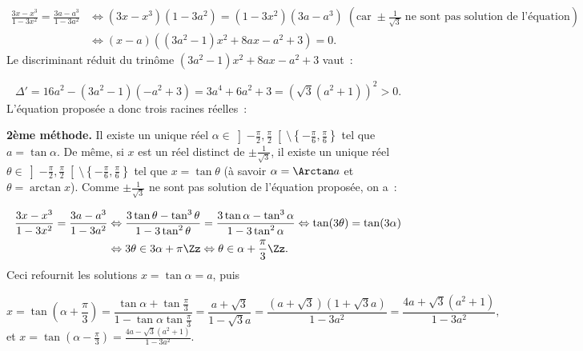 {\begin{enumerate}
{\begin{align*}
\frac{3x-x^3}{1-3x^2}=\frac{3a-a^3}{1-3a^2}&\Leftrightarrow(3x-x^3)(1-3a^2)=(1-3x^2)(3a-a^3)\;(\mbox{car}\;\pm\frac{1}{\sqrt{3}}
\;\mbox{ne sont pas solution de l'équation})\\
 &\Leftrightarrow(x-a)((3a^2-1)x^2+8ax-a^2+3)=0.
\end{align*}
Le discriminant réduit du trinôme $(3a^2-1)x^2+8ax-a^2+3$ vaut~:

$$\Delta'=16a^2-(3a^2-1)(-a^2+3)=3a^4+6a^2+3=(\sqrt{3}(a^2+1))^2>0.$$
L'équation proposée a donc trois racines réelles~:

\begin{center}
\end{center}
\textbf{2ème méthode.} Il existe un unique réel
$\alpha\in\left]-\frac{\pi}{2},\frac{\pi}{2}\right[\setminus\left\{-\frac{\pi}{6},\frac{\pi}{6}\right\}$ tel que $a=\tan\alpha$. De même,
si $x$ est un réel distinct de $\pm\frac{1}{\sqrt{3}}$, il existe un unique réel
$\theta\in\left]-\frac{\pi}{2},\frac{\pi}{2}\right[\setminus\left\{-\frac{\pi}{6},\frac{\pi}{6}\right\}$ tel que $x=\tan\theta$ (à savoir
$\alpha=\Arctan a$ et $\theta=\arctan x$). Comme $\pm\frac{1}{\sqrt{3}}$ ne sont pas solution de l'équation proposée,
on a~:

\begin{align*}
\frac{3x-x^3}{1-3x^2}=\frac{3a-a^3}{1-3a^2}&\Leftrightarrow\frac{3\tan\theta-\tan^3\theta}{1-3\tan^2\theta}
=\frac{3\tan\alpha-\tan^3\alpha}{1-3\tan^2\alpha}\Leftrightarrow\tan(3\theta)=\tan(3\alpha)\\
 &\Leftrightarrow3\theta\in3\alpha+\pi\Zz\Leftrightarrow\theta\in\alpha+\frac{\pi}{3}\Zz.
\end{align*}
Ceci refournit les solutions $x=\tan\alpha=a$, puis

$$x=\tan\left(\alpha+\frac{\pi}{3}\right)=\frac{\tan\alpha+\tan\frac{\pi}{3}}{1-\tan\alpha\tan\frac{\pi}{3}}=\frac{a+\sqrt{3}}{1
-\sqrt{3}a}=\frac{(a+\sqrt{3})(1+\sqrt{3}a)}{1-3a^2}=\frac{4a+\sqrt{3}(a^2+1)}{1-3a^2},$$
et $x=\tan\left(\alpha-\frac{\pi}{3}\right)=\frac{4a-\sqrt{3}(a^2+1)}{1-3a^2}$.}
\end{enumerate}
}